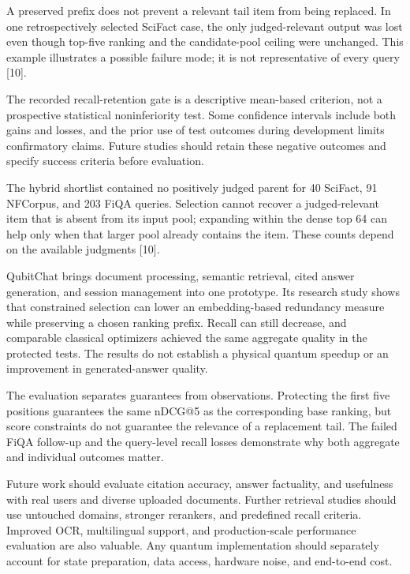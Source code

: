 \documentclass[11pt,a4paper]{article}
\newcommand{\reportheading}[1]{\par\vspace{4pt}{\large\bfseries #1}\par\vspace{1pt}}
\begin{document}
A preserved prefix does not prevent a relevant tail item from being replaced. In one retrospectively selected SciFact case, the only judged-relevant output was lost even though top-five ranking and the candidate-pool ceiling were unchanged. This example illustrates a possible failure mode; it is not representative of every query [10].

The recorded recall-retention gate is a descriptive mean-based criterion, not a prospective statistical noninferiority test. Some confidence intervals include both gains and losses, and the prior use of test outcomes during development limits confirmatory claims. Future studies should retain these negative outcomes and specify success criteria before evaluation.

The hybrid shortlist contained no positively judged parent for 40 SciFact, 91 NFCorpus, and 203 FiQA queries. Selection cannot recover a judged-relevant item that is absent from its input pool; expanding within the dense top 64 can help only when that larger pool already contains the item. These counts depend on the available judgments [10].

\newpage
\reportheading{4. Concluding Remarks}
QubitChat brings document processing, semantic retrieval, cited answer generation, and session management into one prototype. Its research study shows that constrained selection can lower an embedding-based redundancy measure while preserving a chosen ranking prefix. Recall can still decrease, and comparable classical optimizers achieved the same aggregate quality in the protected tests. The results do not establish a physical quantum speedup or an improvement in generated-answer quality.

The evaluation separates guarantees from observations. Protecting the first five positions guarantees the same nDCG@5 as the corresponding base ranking, but score constraints do not guarantee the relevance of a replacement tail. The failed FiQA follow-up and the query-level recall losses demonstrate why both aggregate and individual outcomes matter.

\reportheading{5. Future Work}
Future work should evaluate citation accuracy, answer factuality, and usefulness with real users and diverse uploaded documents. Further retrieval studies should use untouched domains, stronger rerankers, and predefined recall criteria. Improved OCR, multilingual support, and production-scale performance evaluation are also valuable. Any quantum implementation should separately account for state preparation, data access, hardware noise, and end-to-end cost.
\end{document}
